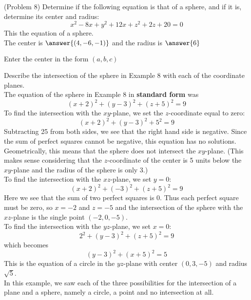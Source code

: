 \documentclass[handout]{ximera}
\begin{document}
\begin{problem}(Problem 8)
Determine if the following equation is that of a sphere, and if it is, determine its center and radius:
\[
x^2 -8x + y^2 + 12x + z^2 + 2z + 20 = 0
\]
This  the equation of a sphere.\\
The center is $\answer{(4,-6,-1)}$ and the radius is $\answer{6}$
\begin{hint}
Enter the center in the form $(a, b, c)$
\end{hint}
\end{problem}

\begin{example}[Example 9]
Describe the intersection of the sphere in Example 8 with each of the coordinate planes.\\
The equation of the sphere in Example 8 in {\bf standard form} was
\[
(x+2)^2 +(y-3)^2 + (z+5)^2 = 9
\]
To find the intersection with the $xy$-plane, we set the $z$-coordinate equal to zero:
\[
(x+2)^2 +(y-3)^2 + 5^2 = 9
\]
Subtracting 25 from both sides, we see that the right hand side is negative.  
Since the sum of perfect squares cannot be negative, this equation has no solutions.
Geometrically, this means that the sphere does not intersect the $xy$-plane. 
(This makes sense considering that the $z$-coordinate of the center is 5 units 
below the $xy$-plane and the radius of the sphere is only 3.)\\
To find the intersection with the $xz$-plane, we set $y = 0$:
\[
(x+2)^2 + (-3)^2 + (z+5)^2 = 9
\]
Here we see that the sum of two perfect squares is 0.  Thus each perfect square must be zero, so $x = -2$ and $z = -5$ and 
the intersection of the sphere with the $xz$-plane is the single point $(-2, 0, -5)$.\\
To find the intersection with the $yz$-plane, we set $x = 0$:
\[
2^2 + (y-3)^2 + (z+5)^2 = 9
\]
which becomes
\[
(y-3)^2 + (x+5)^2 = 5
\]
This is the equation of a circle in the $yz$-plane with center $(0, 3, -5)$ and radius $\sqrt 5$.\\
In this example, we saw each of the three possibilities for the intersection of a 
plane and a sphere, namely a circle, a point and no intersection at all.
\end{example}
\end{document}
